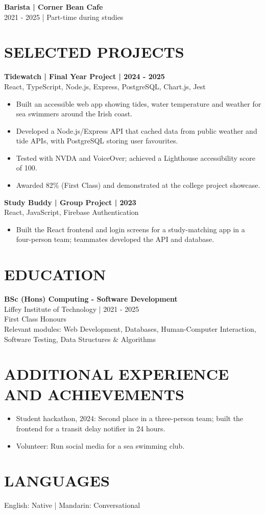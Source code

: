 \documentclass[11pt,a4paper]{article}
\newcommand{\cvsection}[1]{\section*{#1}}
\newcommand{\cvrole}[2]{\textbf{#1}\\#2\par}
\begin{document}
\cvrole{Barista | Corner Bean Cafe}{2021 - 2025 | Part-time during studies}

\newpage
\cvsection{SELECTED PROJECTS}
\textbf{Tidewatch | Final Year Project | 2024 - 2025}\\
React, TypeScript, Node.js, Express, PostgreSQL, Chart.js, Jest
\begin{itemize}
\item Built an accessible web app showing tides, water temperature and weather for sea swimmers around the Irish coast.
\item Developed a Node.js/Express API that cached data from public weather and tide APIs, with PostgreSQL storing user favourites.
\item Tested with NVDA and VoiceOver; achieved a Lighthouse accessibility score of 100.
\item Awarded 82\% (First Class) and demonstrated at the college project showcase.
\end{itemize}

\textbf{Study Buddy | Group Project | 2023}\\
React, JavaScript, Firebase Authentication
\begin{itemize}
\item Built the React frontend and login screens for a study-matching app in a four-person team; teammates developed the API and database.
\end{itemize}

\cvsection{EDUCATION}
\textbf{BSc (Hons) Computing - Software Development}\\
Liffey Institute of Technology | 2021 - 2025\\
First Class Honours\\
Relevant modules: Web Development, Databases, Human-Computer Interaction, Software Testing, Data Structures \& Algorithms

\cvsection{ADDITIONAL EXPERIENCE AND ACHIEVEMENTS}
\begin{itemize}
\item Student hackathon, 2024: Second place in a three-person team; built the frontend for a transit delay notifier in 24 hours.
\item Volunteer: Run social media for a sea swimming club.
\end{itemize}

\cvsection{LANGUAGES}
English: Native | Mandarin: Conversational
\end{document}
